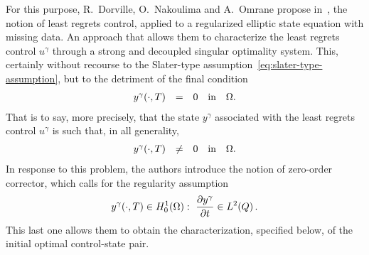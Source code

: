 For this purpose,  R.~Dorville, O.~Nakoulima and A.~Omrane propose
in~\cite{dorville}, the notion of least regrets control, applied to a
regularized elliptic state equation with missing data. An approach that
allows them to characterize the least regrets control $u^{\gamma}$ through
a strong and decoupled singular optimality system. This, certainly without
recourse to the Slater-type assumption~\eqref{eq:slater-type-assumption},
but to the detriment of the final condition
\begin{equation*}
    \begin{array}{rclll}
        {y^{\gamma}}\!\left({\cdot,T}\right) & = & 0 & \text{in} & \Omega.
    \end{array}
\end{equation*}
That is to say, more precisely, that the state $y^{\gamma}$ associated with
the least regrets control $u^{\gamma}$ is such that, in all generality,
\begin{equation*}
    \begin{array}{rclll}
        {y^{\gamma}}\!\left({\cdot,T}\right) & \neq & 0 & \text{in} & \Omega.
    \end{array}
\end{equation*}
In response to this problem, the authors introduce the notion of zero-order
corrector, which calls for the regularity assumption
\begin{equation}\label{eq:dorvilleassumption}
    {y^{\gamma}}\!\left({\cdot,T}\right)\in H_{0}^{1}(\Omega):\
    \dfrac{\partial{}y^{\gamma}}{\partial{}t}\in L^{2}\!\left({Q}\right).
\end{equation}
This last one allows them to obtain the characterization, specified below,
of the initial optimal control-state pair.


